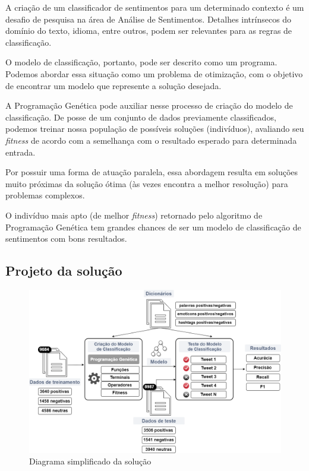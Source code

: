 \documentclass[12pt]{article}
\begin{document}
A criação de um classificador de sentimentos para um determinado contexto é um desafio de pesquisa na área de Análise de Sentimentos. Detalhes intrínsecos do domínio do texto, idioma, entre outros, podem ser relevantes para as regras de classificação. 

O modelo de classificação, portanto, pode ser descrito como um programa. Podemos abordar essa situação como um problema de otimização, com o objetivo de encontrar um modelo que represente a solução desejada.

A Programação Genética pode auxiliar nesse processo de criação do modelo de classificação. De posse de um conjunto de dados previamente classificados, podemos treinar nossa população de possíveis soluções (indivíduos), avaliando seu \emph{fitness} de acordo com a semelhança com o resultado esperado para determinada entrada.

Por possuir uma forma de atuação paralela, essa abordagem resulta em soluções muito próximas da solução ótima (às vezes encontra a melhor resolução) para problemas complexos.

O indivíduo mais apto (de melhor \emph{fitness}) retornado pelo algoritmo de Programação Genética tem grandes chances de ser um modelo de classificação de sentimentos com bons resultados.

\subsection{Projeto da solução}

\begin{figure}[!htb]
	\centering
	\includegraphics[width=1\textwidth]{diagrama2}
	\caption{Diagrama simplificado da solução}
	\label{diagrama}
\end{figure}
\end{document}
